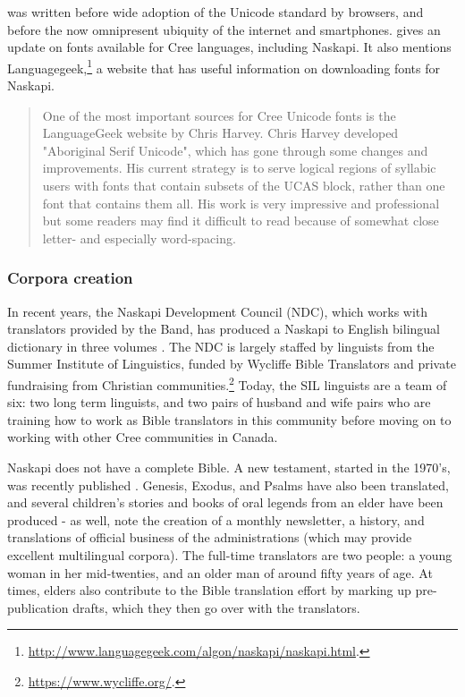 \citet{jancewicz2002applied} was written before wide adoption of the Unicode standard by browsers, and before the now omnipresent ubiquity of the internet and smartphones. \citet{jancewicz2012cree} gives an update on fonts available for Cree languages, including Naskapi. It also mentions Languagegeek,\footnote{\href{http://www.languagegeek.com/algon/naskapi/naskapi.html}{http://www.languagegeek.com/algon/naskapi/naskapi.html}. } a website that has useful information on downloading fonts for Naskapi.

\begin{quote}
One of the most important sources for Cree Unicode fonts is the LanguageGeek website by Chris Harvey. Chris Harvey developed "Aboriginal Serif Unicode", which has gone through some changes and improvements. His current strategy is to serve logical regions of syllabic users with fonts that contain subsets of the UCAS block, rather than one font that contains them all. His work is very impressive and professional but some readers may find it difficult to read because of somewhat close letter- and especially word-spacing. \citep[17]{jancewicz2012cree}
\end{quote}

\subsubsection{Corpora creation}

In recent years, the Naskapi Development Council (NDC), which works with translators provided by the Band, has produced a Naskapi to English bilingual dictionary in three volumes \citep{MacKenzie-and-Jancewicz-1994}. The NDC is largely staffed by linguists from the Summer Institute of Linguistics, funded by Wycliffe Bible Translators and private fundraising from Christian communities.\footnote{\href{https://www.wycliffe.org/}{https://www.wycliffe.org/}. } Today, the SIL linguists are a team of six: two long term linguists, and two pairs of husband and wife pairs who are training how to work as Bible translators in this community before moving on to working with other Cree communities in Canada.

Naskapi does not have a complete Bible. A new testament, started in the 1970's, was recently published \citep{naskapi-new-testament}. Genesis, Exodus, and Psalms have also been translated, and several children's stories and books of oral legends from an elder have been produced - as well, \citet{jancewicz2002applied} note the creation of a monthly newsletter, a history, and translations of official business of the administrations (which may provide excellent multilingual corpora). The full-time translators are two people: a young woman in her mid-twenties, and an older man of around fifty years of age. At times, elders also contribute to the Bible translation effort by marking up pre-publication drafts, which they then go over with the translators.

